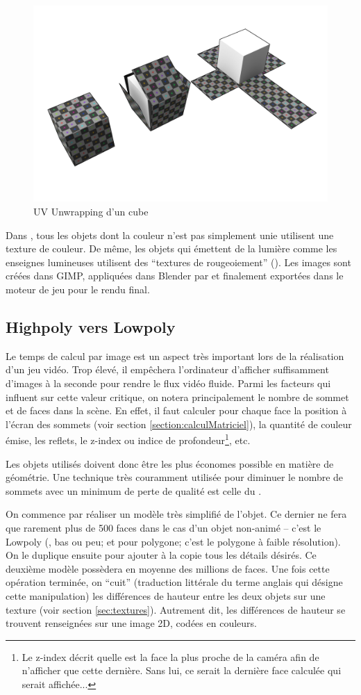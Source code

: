 \begin{figure}[th!]
	\center
	\includegraphics[width=.5\textwidth]{images/Technique/uvUnwrap.png}
	\caption{\label{fig:uvUnwrap}UV Unwrapping d'un cube}
\end{figure}

Dans \nomJeu, tous les objets dont la couleur n'est pas simplement unie utilisent une texture de couleur. De même, les objets qui émettent de la lumière comme les enseignes lumineuses utilisent des \enquote{textures de rougeoiement} (). Les images sont créées dans GIMP, appliquées dans Blender par  et finalement exportées dans le moteur de jeu pour le rendu final.



\subsection{Highpoly vers Lowpoly}
\label{sec:highpolyVersLowpoly}
Le temps de calcul par image est un aspect très important lors de la réalisation d'un jeu vidéo. Trop élevé, il empêchera l'ordinateur d'afficher suffisamment d'images à la seconde pour rendre le flux vidéo fluide. Parmi les facteurs qui influent sur cette valeur critique, on notera principalement le nombre de sommet et de faces dans la scène. En effet, il faut calculer pour chaque face la position à l'écran des sommets (voir section \ref{section:calculMatriciel}), la quantité de couleur émise, les reflets, le z-index ou indice de profondeur\footnote{Le z-index décrit quelle est la face la plus proche de la caméra afin de n'afficher que cette dernière. Sans lui, ce serait la dernière face calculée qui serait affichée...}, etc.

Les objets utilisés doivent donc être les plus économes possible en matière de géométrie. Une technique très couramment utilisée pour diminuer le nombre de sommets avec un minimum de perte de qualité est celle du .

On commence par réaliser un modèle très simplifié de l'objet. Ce dernier ne fera que rarement plus de 500 faces dans le cas d'un objet non-animé -- c'est le Lowpoly (, bas ou peu; et  pour polygone; c'est le polygone à faible résolution). On le duplique ensuite pour ajouter à la copie tous les détails désirés. Ce deuxième modèle possèdera en moyenne des millions de faces. Une fois cette opération terminée, on \enquote{cuit} (traduction littérale du terme anglais  qui désigne cette manipulation) les différences de hauteur entre les deux objets sur une texture (voir section \ref{sec:textures}). Autrement dit, les différences de hauteur se trouvent renseignées sur une image 2D, codées en couleurs.

